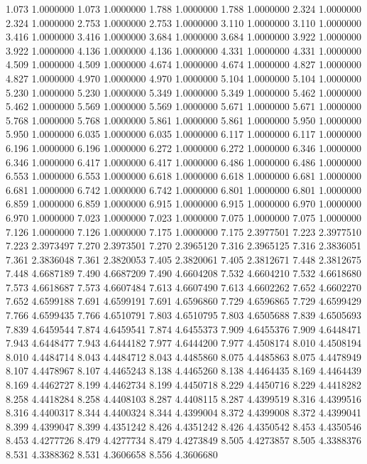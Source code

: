 1.073 1.0000000
1.073 1.0000000
1.788 1.0000000
1.788 1.0000000
2.324 1.0000000
2.324 1.0000000
2.753 1.0000000
2.753 1.0000000
3.110 1.0000000
3.110 1.0000000
3.416 1.0000000
3.416 1.0000000
3.684 1.0000000
3.684 1.0000000
3.922 1.0000000
3.922 1.0000000
4.136 1.0000000
4.136 1.0000000
4.331 1.0000000
4.331 1.0000000
4.509 1.0000000
4.509 1.0000000
4.674 1.0000000
4.674 1.0000000
4.827 1.0000000
4.827 1.0000000
4.970 1.0000000
4.970 1.0000000
5.104 1.0000000
5.104 1.0000000
5.230 1.0000000
5.230 1.0000000
5.349 1.0000000
5.349 1.0000000
5.462 1.0000000
5.462 1.0000000
5.569 1.0000000
5.569 1.0000000
5.671 1.0000000
5.671 1.0000000
5.768 1.0000000
5.768 1.0000000
5.861 1.0000000
5.861 1.0000000
5.950 1.0000000
5.950 1.0000000
6.035 1.0000000
6.035 1.0000000
6.117 1.0000000
6.117 1.0000000
6.196 1.0000000
6.196 1.0000000
6.272 1.0000000
6.272 1.0000000
6.346 1.0000000
6.346 1.0000000
6.417 1.0000000
6.417 1.0000000
6.486 1.0000000
6.486 1.0000000
6.553 1.0000000
6.553 1.0000000
6.618 1.0000000
6.618 1.0000000
6.681 1.0000000
6.681 1.0000000
6.742 1.0000000
6.742 1.0000000
6.801 1.0000000
6.801 1.0000000
6.859 1.0000000
6.859 1.0000000
6.915 1.0000000
6.915 1.0000000
6.970 1.0000000
6.970 1.0000000
7.023 1.0000000
7.023 1.0000000
7.075 1.0000000
7.075 1.0000000
7.126 1.0000000
7.126 1.0000000
7.175 1.0000000
7.175 2.3977501
7.223 2.3977510
7.223 2.3973497
7.270 2.3973501
7.270 2.3965120
7.316 2.3965125
7.316 2.3836051
7.361 2.3836048
7.361 2.3820053
7.405 2.3820061
7.405 2.3812671
7.448 2.3812675
7.448 4.6687189
7.490 4.6687209
7.490 4.6604208
7.532 4.6604210
7.532 4.6618680
7.573 4.6618687
7.573 4.6607484
7.613 4.6607490
7.613 4.6602262
7.652 4.6602270
7.652 4.6599188
7.691 4.6599191
7.691 4.6596860
7.729 4.6596865
7.729 4.6599429
7.766 4.6599435
7.766 4.6510791
7.803 4.6510795
7.803 4.6505688
7.839 4.6505693
7.839 4.6459544
7.874 4.6459541
7.874 4.6455373
7.909 4.6455376
7.909 4.6448471
7.943 4.6448477
7.943 4.6444182
7.977 4.6444200
7.977 4.4508174
8.010 4.4508194
8.010 4.4484714
8.043 4.4484712
8.043 4.4485860
8.075 4.4485863
8.075 4.4478949
8.107 4.4478967
8.107 4.4465243
8.138 4.4465260
8.138 4.4464435
8.169 4.4464439
8.169 4.4462727
8.199 4.4462734
8.199 4.4450718
8.229 4.4450716
8.229 4.4418282
8.258 4.4418284
8.258 4.4408103
8.287 4.4408115
8.287 4.4399519
8.316 4.4399516
8.316 4.4400317
8.344 4.4400324
8.344 4.4399004
8.372 4.4399008
8.372 4.4399041
8.399 4.4399047
8.399 4.4351242
8.426 4.4351242
8.426 4.4350542
8.453 4.4350546
8.453 4.4277726
8.479 4.4277734
8.479 4.4273849
8.505 4.4273857
8.505 4.3388376
8.531 4.3388362
8.531 4.3606658
8.556 4.3606680
